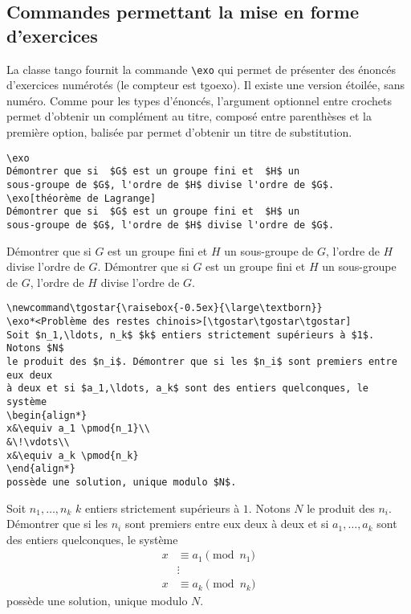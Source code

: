 \documentclass[french,ColorTheme=USAF,FontSize=10pt]{tango}
\newcommand\TO[1]{\textsf{#1}}
\begin{document}
\subsection{Commandes permettant la mise en forme d'exercices}
La classe tango fournit la commande  \verb+\exo+ qui permet de présenter des énoncés d'exercices numérotés (le compteur est  \TO{tgoexo}). Il existe une version étoilée, sans numéro. Comme pour les types d'énoncés, l'argument optionnel entre crochets permet d'obtenir un complément au titre, composé entre parenthèses et la première option, balisée par \frquote{\TO{< >}} permet d'obtenir un titre de substitution.
\begin{tcolorbox}
\begin{verbatim}
\exo 
Démontrer que si  $G$ est un groupe fini et  $H$ un 
sous-groupe de $G$, l'ordre de $H$ divise l'ordre de $G$.
\exo[théorème de Lagrange]
Démontrer que si  $G$ est un groupe fini et  $H$ un 
sous-groupe de $G$, l'ordre de $H$ divise l'ordre de $G$.
\end{verbatim}
\end{tcolorbox}
\exo 
Démontrer que si  $G$ est un groupe fini et  $H$ un 
sous-groupe de $G$, l'ordre de $H$ divise l'ordre de $G$.
Démontrer que si  $G$ est un groupe fini et  $H$ un 
sous-groupe de $G$, l'ordre de $H$ divise l'ordre de $G$.
\begin{tcolorbox}
\begin{verbatim}
\newcommand\tgostar{\raisebox{-0.5ex}{\large\textborn}}
\exo*<Problème des restes chinois>[\tgostar\tgostar\tgostar]
Soit $n_1,\ldots, n_k$ $k$ entiers strictement supérieurs à $1$. Notons $N$
le produit des $n_i$. Démontrer que si les $n_i$ sont premiers entre eux deux
à deux et si $a_1,\ldots, a_k$ sont des entiers quelconques, le système
\begin{align*}
x&\equiv a_1 \pmod{n_1}\\
&\!\vdots\\
x&\equiv a_k \pmod{n_k}
\end{align*}
possède une solution, unique modulo $N$.
\end{verbatim}
\end{tcolorbox}
\newcommand\tgostar{\raisebox{-0.5ex}{\large\textborn}}
\exo*<Problème des restes chinois>[\tgostar\tgostar\tgostar]
Soit $n_1,\ldots, n_k$ $k$ entiers strictement supérieurs à $1$. Notons $N$
le produit des $n_i$. Démontrer que si les $n_i$ sont premiers entre eux deux à deux et si
$a_1,\ldots, a_k$ sont des entiers quelconques, le système
\begin{align*}
x&\equiv a_1 \pmod{n_1}\\
&\!\vdots\\
x&\equiv a_k \pmod{n_k}
\end{align*}
possède une solution, unique modulo $N$.
\end{document}
